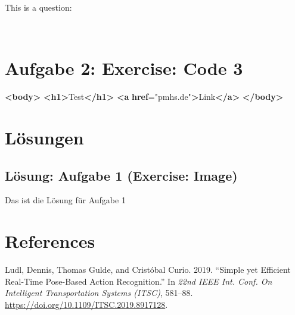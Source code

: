 \documentclass[
]{scrartcl}
\newenvironment{Shaded}{}{}
\newcommand{\ErrorTok}[1]{\textcolor[rgb]{1.00,0.00,0.00}{\textbf{#1}}}
\newcommand{\KeywordTok}[1]{\textcolor[rgb]{0.00,0.44,0.13}{\textbf{#1}}}
\newcommand{\NormalTok}[1]{#1}
\newcommand{\OtherTok}[1]{\textcolor[rgb]{0.00,0.44,0.13}{#1}}
\newcommand{\StringTok}[1]{\textcolor[rgb]{0.25,0.44,0.63}{#1}}
\newlength{\cslhangindent}
\newlength{\cslentryspacingunit} %
\newenvironment{CSLReferences}[2] %
 {%
  \setlength{\parindent}{0pt}
  \ifodd #1
  \let\oldpar\par
  \def\par{\hangindent=\cslhangindent\oldpar}
  \fi
  \setlength{\parskip}{#2\cslentryspacingunit}
 }%
 {}
\newcommand{\marginexercise}{\protect\marginnote{\hfill\Large\faIcon{pencil-alt}}}
\begin{document}
This is a question:

~\\ 

\hypertarget{exercise-code}{%
\section{\texorpdfstring{\marginexercise Aufgabe 2: Exercise:
Code\hfill\normalsize{} 3}{Exercise: Code}}\label{exercise-code}}

\begin{Shaded}
\begin{Highlighting}[]
\KeywordTok{\textless{}body\textgreater{}}
  \KeywordTok{\textless{}h1\textgreater{}}\NormalTok{Test}\KeywordTok{\textless{}/h1\textgreater{}}
  \KeywordTok{\textless{}a} \ErrorTok{href}\OtherTok{=}\StringTok{"pmhs.de"}\KeywordTok{\textgreater{}}\NormalTok{Link}\KeywordTok{\textless{}/a\textgreater{}}
\KeywordTok{\textless{}/body\textgreater{}}
\end{Highlighting}
\end{Shaded}

\newpage

\hypertarget{luxf6sungen}{%
\section{Lösungen}\label{luxf6sungen}}

\subsection{Lösung: Aufgabe 1 (Exercise: Image)}

Das ist die Lösung für Aufgabe 1

\newpage

\hypertarget{references}{%
\section*{References}\label{references}}

\hypertarget{refs}{}
\begin{CSLReferences}{1}{0}
\leavevmode{}%
Ludl, Dennis, Thomas Gulde, and Cristóbal Curio. 2019. {``Simple yet
Efficient Real-Time Pose-Based Action Recognition.''} In \emph{22nd
{IEEE Int}. {Conf}. On {Intelligent Transportation Systems} ({ITSC})},
581--88. \url{https://doi.org/10.1109/ITSC.2019.8917128}.

\end{CSLReferences}
\end{document}
